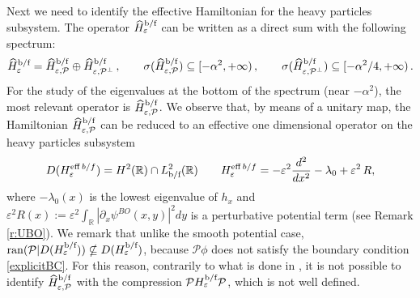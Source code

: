 \documentclass[a4paper,11pt,reqno]{amsart}
\theoremstyle{definition}
\numberwithin{equation}{section}
\newcommand{\ran}{\operatorname{ran }}
\newcommand{\RE}{\mathbb R}
\newcommand{\rr}{\mathbb R}
\newcommand{\PP}{\mathcal P}
\newcommand{\ve}{\varepsilon}
\newcommand{\eff}{\mathrm{eff}}
\newcommand{\bof}{\text{\rm b/f}}
\begin{document}
  
\par
Next we need to identify the effective Hamiltonian for the heavy particles subsystem. The operator $\widehat H^{\bof}_\ve$ can be written as a direct sum with the following spectrum:
\[\widehat H^{\bof}_\ve = \widehat H^{\bof}_{\ve,\PP}\oplus \widehat H^{\bof}_{\ve,\PP^\perp}\,,\qquad
\sigma(\widehat H^{\bof}_{\ve,\PP})  \subseteq[-\alpha^2,+\infty)\,,\qquad
\sigma(\widehat H^{\bof}_{\ve,\PP^\perp}) \subseteq[-\alpha^2/4,+\infty)\,.
\] 
For the study of the eigenvalues at the bottom of the spectrum (near $-\alpha^2$), the most relevant operator is $\widehat H^{\bof}_{\ve,\PP}$. We observe that, by means of a unitary map, the Hamiltonian  $\widehat H^{\bof}_{\ve,\PP}$ can be reduced to an effective  one dimensional operator on the heavy particles subsystem 
\[      D(H^{\eff\, b/f }_\ve) =H^{2}(\RE)\cap L^{2}_{\bof}(\RE)\qquad  
       H^{\eff\, b/f}_\ve  
       = -\ve^2 \frac{d^2}{dx^2}-\lambda_0 + \ve^2 \,R,
  \]
where $-\lambda_0(x)$ is the lowest eigenvalue of $h_x$ and $ \ve^2 R(x) := \ve^2 \int_\rr |\partial_x \psi^{BO}(x,y)|^2 dy$ is a perturbative potential term (see Remark \ref{r:UBO}). We remark that unlike the smooth potential case, $\ran(\PP| D( H^{\bof}_{\ve}))  \nsubseteq D( H^{\bof}_{\ve})$, because $\mathcal{P} \phi$ does not satisfy the boundary condition \eqref{explicitBC}. For this reason, contrarily to what is done in \cite{Krejcirik-etal-m2018},  it is not possible to identify $\widehat H^{\bof}_{\ve,\PP}$ with the compression $\PP H^{\bof}_{\ve}\PP$, which is not well defined. 
\end{document}
